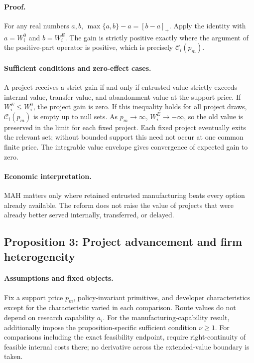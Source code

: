 \paragraph{Proof.}
For any real numbers \(a,b\),
\(\max\{a,b\}-a=[b-a]_+\). Apply the identity with
\(a=W_i^0\) and \(b=W_i^E\). The gain is strictly positive exactly where the
argument of the positive-part operator is positive, which is precisely
\(\mathcal C_i(p_m)\).

\paragraph{Sufficient conditions and zero-effect cases.}
A project receives a strict gain if and only if entrusted value strictly
exceeds internal value, transfer value, and abandonment value at the support
price. If \(W_i^E\leq W_i^0\), the project gain is zero. If this inequality
holds for all project draws, \(\mathcal C_i(p_m)\) is empty up to null sets.
As \(p_m\rightarrow\infty\), \(W_i^E\rightarrow-\infty\), so the old value is
preserved in the limit for each fixed project. Each fixed project eventually
exits the relevant set; without bounded support this need not occur at one
common finite price. The integrable value envelope gives convergence of
expected gain to zero.

\paragraph{Economic interpretation.}
MAH matters only where retained entrusted manufacturing beats every option
already available. The reform does not raise the value of projects that were
already better served internally, transferred, or delayed.

\subsection{Proposition 3: Project advancement and firm heterogeneity}
\label{prop:p08-advancement}

\paragraph{Assumptions and fixed objects.}
Fix a support price \(p_m\), policy-invariant primitives, and developer
characteristics except for the characteristic varied in each comparison.
Route values do not depend on research capability \(a_i\). For the
manufacturing-capability result, additionally impose the proposition-specific
sufficient condition \(\nu\geq1\). For comparisons including the exact
feasibility endpoint, require right-continuity of feasible internal costs
there; no derivative across the extended-value boundary is taken.

